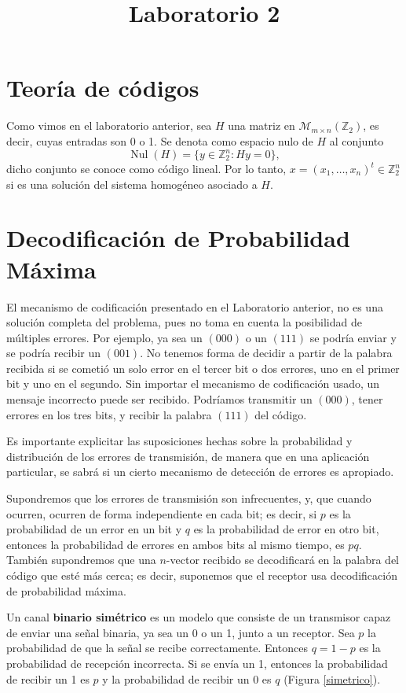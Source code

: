 \documentclass[a4paper]{article}
\title{Laboratorio 2}
\date{}
\newcommand{\Z}{\mathbb{Z}}
\begin{document}
\maketitle
\thispagestyle{fancy}


\section*{Teor\'ia de c\'odigos}
\vspace{0.2 cm}
Como vimos en el laboratorio anterior, sea $H$ una matriz en $\mathcal{M}_{m \times n}(\Z_2)$, es decir, cuyas entradas
son 0 o 1. Se denota como espacio nulo de $H$ al conjunto
\[\operatorname{Nul}(H)=\{y\in \Z^n_2\colon Hy=0\},\]
dicho conjunto se conoce como c\'odigo lineal. Por lo tanto, $x=(x_1,\dots, x_n)^t\in \Z^n_2$ si es una soluci\'on del sistema homog\'eneo asociado a $H$.

\section*{Decodificación de Probabilidad Máxima}
El mecanismo de codificación presentado en el Laboratorio anterior, no es una solución completa del problema, pues no toma en cuenta la posibilidad de múltiples errores. Por ejemplo, ya sea un $(000)$ o un $(111)$ se podría enviar y se podría recibir un $(001)$. No tenemos forma de decidir a partir de la palabra recibida si se cometió un solo error en el tercer bit o dos errores, uno en el primer bit y uno en el segundo. Sin importar el mecanismo de codificación usado, un mensaje incorrecto puede ser recibido. Podríamos transmitir un $(000)$, tener errores en los tres bits, y recibir la palabra $(111)$ del código. 


Es importante explicitar las suposiciones hechas sobre la probabilidad y distribución de los errores de transmisión, de manera que en una aplicación particular, se sabrá si un cierto mecanismo de detección de errores es apropiado. 

Supondremos que los errores de transmisión son infrecuentes, y, que cuando ocurren, ocurren de forma independiente en cada bit; es decir, si $p$ es la probabilidad de un error en un bit y $q$ es la probabilidad de error en otro bit, entonces la probabilidad de errores en ambos bits al mismo tiempo, es $pq$. También supondremos que una $n$-vector recibido se decodificará en la palabra del código que esté más cerca; es decir, suponemos que el receptor usa decodificación de probabilidad máxima.


Un canal \textbf{binario simétrico} es un modelo que consiste de un transmisor capaz de enviar una señal binaria, ya sea un 0 o un 1, junto a un receptor. Sea $p$ la probabilidad de que la señal se recibe correctamente. Entonces $q=1-p$ es la probabilidad de recepción incorrecta. Si se envía un 1, entonces la probabilidad de recibir un 1 es $p$ y la probabilidad de recibir un 0 es $q$
 (Figura \ref{simetrico}). 
 
\end{document}
